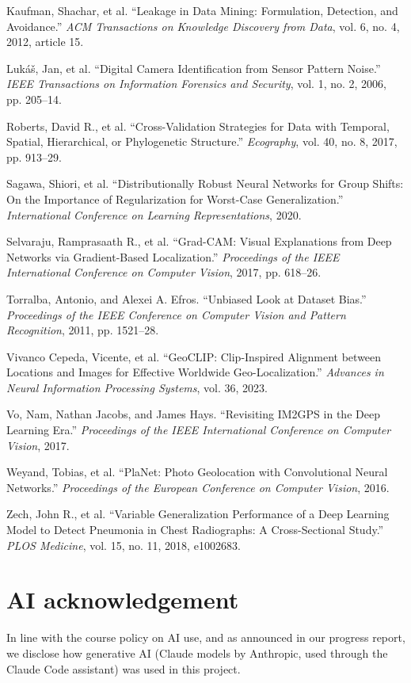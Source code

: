 \documentclass[11pt]{article}
\begin{document}
\begin{description}[leftmargin=2em,labelindent=0pt,font=\normalfont,itemsep=2pt]
\item Kaufman, Shachar, et al. ``Leakage in Data Mining: Formulation, Detection, and Avoidance.'' \emph{ACM Transactions on Knowledge Discovery from Data}, vol. 6, no. 4, 2012, article 15.
\item Luk\'a\v{s}, Jan, et al. ``Digital Camera Identification from Sensor Pattern Noise.'' \emph{IEEE Transactions on Information Forensics and Security}, vol. 1, no. 2, 2006, pp. 205--14.
\item Roberts, David R., et al. ``Cross-Validation Strategies for Data with Temporal, Spatial, Hierarchical, or Phylogenetic Structure.'' \emph{Ecography}, vol. 40, no. 8, 2017, pp. 913--29.
\item Sagawa, Shiori, et al. ``Distributionally Robust Neural Networks for Group Shifts: On the Importance of Regularization for Worst-Case Generalization.'' \emph{International Conference on Learning Representations}, 2020.
\item Selvaraju, Ramprasaath R., et al. ``Grad-CAM: Visual Explanations from Deep Networks via Gradient-Based Localization.'' \emph{Proceedings of the IEEE International Conference on Computer Vision}, 2017, pp. 618--26.
\item Torralba, Antonio, and Alexei A. Efros. ``Unbiased Look at Dataset Bias.'' \emph{Proceedings of the IEEE Conference on Computer Vision and Pattern Recognition}, 2011, pp. 1521--28.
\item Vivanco Cepeda, Vicente, et al. ``GeoCLIP: Clip-Inspired Alignment between Locations and Images for Effective Worldwide Geo-Localization.'' \emph{Advances in Neural Information Processing Systems}, vol. 36, 2023.
\item Vo, Nam, Nathan Jacobs, and James Hays. ``Revisiting IM2GPS in the Deep Learning Era.'' \emph{Proceedings of the IEEE International Conference on Computer Vision}, 2017.
\item Weyand, Tobias, et al. ``PlaNet: Photo Geolocation with Convolutional Neural Networks.'' \emph{Proceedings of the European Conference on Computer Vision}, 2016.
\item Zech, John R., et al. ``Variable Generalization Performance of a Deep Learning Model to Detect Pneumonia in Chest Radiographs: A Cross-Sectional Study.'' \emph{PLOS Medicine}, vol. 15, no. 11, 2018, e1002683.
\end{description}

\section*{AI acknowledgement}
In line with the course policy on AI use, and as announced in our progress report, we disclose how
generative AI (Claude models by Anthropic, used through the Claude Code assistant) was used in this project.
\end{document}
